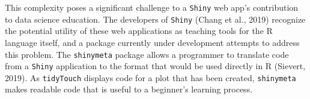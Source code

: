 \documentclass[english,man,floatsintext]{apa6}
\newenvironment{Shaded}{\begin{snugshade}}{\end{snugshade}}
\newcommand{\CommentTok}[1]{\textcolor[rgb]{0.56,0.35,0.01}{\textit{#1}}}
\newcommand{\ControlFlowTok}[1]{\textcolor[rgb]{0.13,0.29,0.53}{\textbf{#1}}}
\newcommand{\DataTypeTok}[1]{\textcolor[rgb]{0.13,0.29,0.53}{#1}}
\newcommand{\KeywordTok}[1]{\textcolor[rgb]{0.13,0.29,0.53}{\textbf{#1}}}
\newcommand{\NormalTok}[1]{#1}
\newcommand{\OperatorTok}[1]{\textcolor[rgb]{0.81,0.36,0.00}{\textbf{#1}}}
\newcommand{\StringTok}[1]{\textcolor[rgb]{0.31,0.60,0.02}{#1}}
\begin{document}
\begin{Shaded}
\end{Shaded}

This complexity poses a significant challenge to a \texttt{Shiny} web app's contribution to data science education. The developers of \texttt{Shiny} (Chang et al., 2019) recognize the potential utility of these web applications as teaching tools for the R language itself, and a package currently under development attempts to address this problem. The \texttt{shinymeta} package allows a programmer to translate code from a \texttt{Shiny} application to the format that would be used directly in R (Sievert, 2019). As \texttt{tidyTouch} displays code for a plot that has been created, \texttt{shinymeta} makes readable code that is useful to a beginner's learning process.
\end{document}
